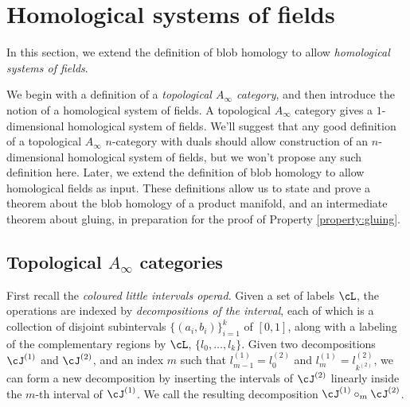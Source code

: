 \section{Homological systems of fields}
\label{sec:homological-fields}

In this section, we extend the definition of blob homology to allow \emph{homological systems of fields}.

We begin with a definition of a \emph{topological $A_\infty$ category}, and then introduce the notion of a homological system of fields. A topological $A_\infty$ category gives a $1$-dimensional homological system of fields. We'll suggest that any good definition of a topological $A_\infty$ $n$-category with duals should allow construction of an $n$-dimensional homological system of fields, but we won't propose any such definition here. Later, we extend the definition of blob homology to allow homological fields as input. These definitions allow us to state and prove a theorem about the blob homology of a product manifold, and an intermediate theorem about gluing, in preparation for the proof of Property \ref{property:gluing}.

\subsection{Topological $A_\infty$ categories}

First recall the \emph{coloured little intervals operad}. Given a set of labels $\cL$, the operations are indexed by \emph{decompositions of the interval}, each of which is a collection of disjoint subintervals $\{(a_i,b_i)\}_{i=1}^k$ of $[0,1]$, along with a labeling of the complementary regions by $\cL$, $\{l_0, \ldots, l_k\}$.  Given two decompositions $\cJ^{(1)}$ and $\cJ^{(2)}$, and an index $m$ such that $l^{(1)}_{m-1} = l^{(2)}_0$ and $l^{(1)}_{m} = l^{(2)}_{k^{(2)}}$, we can form a new decomposition by inserting the intervals of $\cJ^{(2)}$ linearly inside the $m$-th interval of $\cJ^{(1)}$. We call the resulting decomposition $\cJ^{(1)} \circ_m \cJ^{(2)}$.

